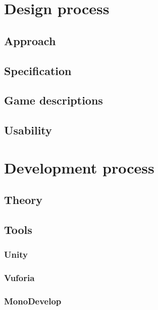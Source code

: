 \documentclass[BSP,english,oneside]{classes/gucthesis}
\begin{document}
\part{Design process}

	\chapter{Approach}

	\chapter{Specification}
		\label{chap:specification}
		

	\chapter{Game descriptions}
		\label{chap:game_descriptions}
		

	\chapter{Usability}
		\label{chap:usability}
		


\part{Development process}

	\chapter{Theory}

	\chapter{Tools}
		\label{chap:tools}

		\section{Unity}
			

		\section{Vuforia}
			

		\section{MonoDevelop}
			
\end{document}
